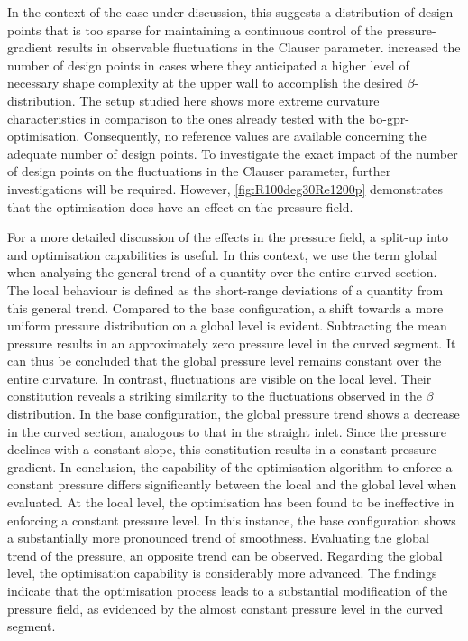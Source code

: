 In the context of the case under discussion, this suggests a distribution of design points that is too sparse for maintaining a continuous control of the pressure-gradient results in observable fluctuations in the Clauser parameter.
\citet{morita_applying_2022} increased the number of design points in cases where they anticipated a higher level of necessary shape complexity at the upper wall to accomplish the desired $\beta$-distribution.
The setup studied here shows more extreme curvature characteristics in comparison to the ones already tested with the \acrshort{bo}-\acrshort{gpr}-optimisation. 
Consequently, no reference values are available concerning the adequate number of design points.
To investigate the exact impact of the number of design points on the fluctuations in the Clauser parameter, further investigations will be required.
However, \autoref{fig:R100deg30Re1200p} demonstrates that the optimisation does have an effect on the pressure field.

For a more detailed discussion of the effects in the pressure field, a split-up into  and  optimisation capabilities is useful.
In this context, we use the term global when analysing the general trend of a quantity over the entire curved section.
The local behaviour is defined as the short-range deviations of a quantity from this general trend.
Compared to the base configuration, a shift towards a more uniform pressure distribution on a global level is evident.
Subtracting the mean pressure results in an approximately zero pressure level in the curved segment. 
It can thus be concluded that the global pressure level remains constant over the entire curvature.
In contrast, fluctuations are visible on the local level.
Their constitution reveals a striking similarity to the fluctuations observed in the $\beta$ distribution.
In the base configuration, the global pressure trend shows a decrease in the curved section, analogous to that in the straight inlet.
Since the pressure declines with a constant slope, this constitution results in a constant pressure gradient.
In conclusion, the capability of the optimisation algorithm to enforce a constant pressure differs significantly between the local and the global level when evaluated.
At the local level, the optimisation has been found to be ineffective in enforcing a constant pressure level.
In this instance, the base configuration shows a substantially more pronounced trend of smoothness.
Evaluating the global trend of the pressure, an opposite trend can be observed.
Regarding the global level, the optimisation capability is considerably more advanced.
The findings indicate that the optimisation process leads to a substantial modification of the pressure field, as evidenced by the almost constant pressure level in the curved segment.


